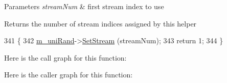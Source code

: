 \begin{DoxyParams}{Parameters}
{\em stream\+Num} & first stream index to use \\
\hline
\end{DoxyParams}
\begin{DoxyReturn}{Returns}
the number of stream indices assigned by this helper 
\end{DoxyReturn}

\begin{DoxyCode}
341 \{
342   \hyperlink{classns3_1_1TvSpectrumTransmitterHelper_ac0914f5455dbfa49826f0879635693e6}{m\_uniRand}->\hyperlink{classns3_1_1RandomVariableStream_add11aaf975607746b7e271d300659a94}{SetStream} (streamNum);
343   \textcolor{keywordflow}{return} 1;
344 \}
\end{DoxyCode}


Here is the call graph for this function\+:




Here is the caller graph for this function\+:


